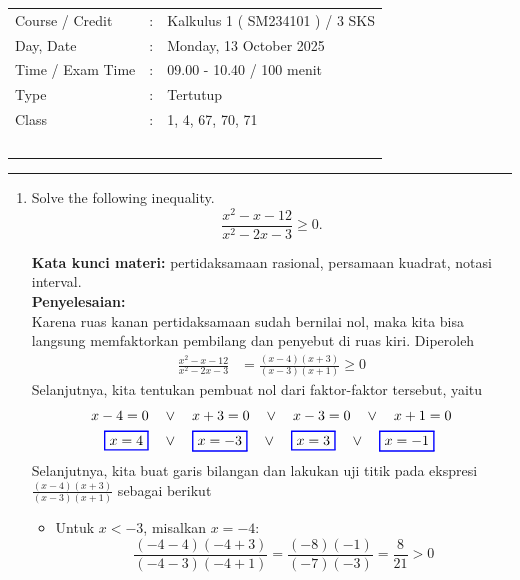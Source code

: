 \documentclass[10pt,openany,a4paper]{article}
\theoremstyle{definition}
\theoremstyle{definition}
\theoremstyle{plain}
\newenvironment{jawab}[2][tes]{%
\par\noindent\textbf{Kata kunci materi:} #1.\\
\textbf{Penyelesaian:} #2%
}{}
\begin{document}
    \begin{center}
	\begin{tabular}{lcl}
		Course / Credit & : & Kalkulus 1 ( SM234101 ) / 3 SKS\\
		Day, Date & : & Monday, 13 October 2025\\
		Time / Exam Time & : & 09.00 - 10.40 / 100 menit\\
		Type & : & Tertutup\\
		Class & : & 1, 4, 67, 70, 71\\
  ~
	\end{tabular}

    \noindent\rule{\textwidth}{2.pt}
        \end{center}
\begin{enumerate}
           \item Solve the following inequality.
    \[\frac{x^2 - x - 12}{x^2 - 2x - 3} \ge 0. \]
    \begin{jawab}[pertidaksamaan rasional, persamaan kuadrat, notasi interval]{~\\
    Karena ruas kanan pertidaksamaan sudah bernilai nol, maka kita bisa langsung memfaktorkan pembilang dan penyebut di ruas kiri. Diperoleh
    \begin{align*}
        \frac{x^2 - x - 12}{x^2 - 2x - 3} &= \frac{(x-4)(x+3)}{(x-3)(x+1)} \ge 0
    \end{align*}
    Selanjutnya, kita tentukan pembuat nol dari faktor-faktor tersebut, yaitu
    \begin{align*}
        x-4 = 0 \quad &\vee\quad x+3 = 0 \quad \vee\quad x-3 = 0 \quad \vee\quad x+1 = 0\\
        \colorlet{oldcolor}{.}
        \color{blue}
        \setlength{\fboxrule}{1pt} \boxed{\color{oldcolor}x=4}\color{oldcolor} \quad &\vee\quad \colorlet{oldcolor}{.}
        \color{blue}
        \setlength{\fboxrule}{1pt} \boxed{\color{oldcolor}x=-3}\color{oldcolor} \quad \vee\quad \colorlet{oldcolor}{.}
        \color{blue}
        \setlength{\fboxrule}{1pt} \boxed{\color{oldcolor}x=3}\color{oldcolor} \quad \vee\quad \colorlet{oldcolor}{.}
        \color{blue}
        \setlength{\fboxrule}{1pt} \boxed{\color{oldcolor}x=-1}\color{oldcolor}
    \end{align*}
    Selanjutnya, kita buat garis bilangan dan lakukan uji titik pada ekspresi \(\frac{(x-4)(x+3)}{(x-3)(x+1)}\) sebagai berikut
    \begin{itemize}
        \item Untuk \(x < -3\), misalkan \(x = -4\):
        \[
        \frac{(-4-4)(-4+3)}{(-4-3)(-4+1)} = \frac{(-8)(-1)}{(-7)(-3)} = \frac{8}{21} > 0
\]
\end{itemize}}
\end{jawab}
\end{enumerate}
\end{document}
